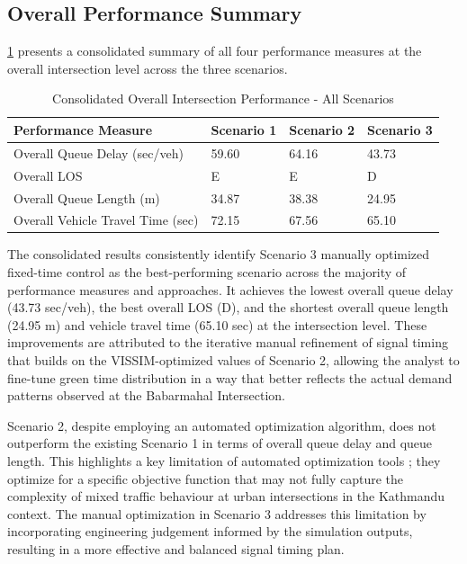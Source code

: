 \subsection{Overall Performance Summary}
\cref{tab:op} presents a consolidated summary of all four performance measures at the overall intersection level across the three scenarios.
\begin{table}[h!]
    \centering
    \caption{Consolidated Overall Intersection Performance - All Scenarios}
    \begin{tabular}{|l|p{2cm}|p{2cm}|p{2cm}|}
        \hline
        Performance Measure&	Scenario 1&	Scenario 2&	Scenario 3 \\ \hline
        Overall Queue Delay (sec/veh)&	59.60	& 64.16	& 43.73 \\ \hline
        Overall LOS &E	& E	& D \\ \hline
        Overall Queue Length (m)	& 34.87	& 38.38	& 24.95 \\ \hline
        Overall Vehicle Travel Time (sec)	& 72.15	& 67.56	& 65.10 \\ \hline
    \end{tabular}
    \label{tab:op}
\end{table}

The consolidated results consistently identify Scenario 3 manually optimized fixed-time control as the best-performing scenario across the majority of performance measures and approaches. It achieves the lowest overall queue delay (43.73 sec/veh), the best overall LOS (D), and the shortest overall queue length (24.95 m) and vehicle travel time (65.10 sec) at the intersection level. These improvements are attributed to the iterative manual refinement of signal timing that builds on the VISSIM-optimized values of Scenario 2, allowing the analyst to fine-tune green time distribution in a way that better reflects the actual demand patterns observed at the Babarmahal Intersection.

Scenario 2, despite employing an automated optimization algorithm, does not outperform the existing Scenario 1 in terms of overall queue delay and queue length. This highlights a key limitation of automated optimization tools ; they optimize for a specific objective function that may not fully capture the complexity of mixed traffic behaviour at urban intersections in the Kathmandu context. The manual optimization in Scenario 3 addresses this limitation by incorporating engineering judgement informed by the simulation outputs, resulting in a more effective and balanced signal timing plan.

